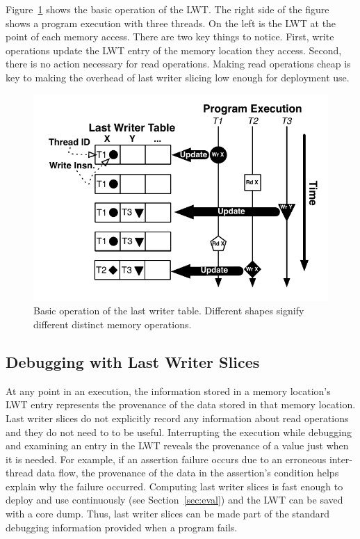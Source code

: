 \documentclass[preprint,9pt]{sigplanconf}
\newcommand{\lwt}{LWT\xspace}
\begin{document}
Figure~\ref{fig:basicLWT} shows the basic operation of the \lwt.  The right
side of the figure shows a program execution with three threads.  On the left
is the \lwt at the point of each memory access.  There are two key things to
notice.  First, write operations update the \lwt entry of the memory location
they access.  Second, there is no action necessary for read operations.
Making read operations cheap is key to making the overhead of last writer
slicing low enough for deployment use.

\begin{figure}[h]
\centering
\includegraphics[scale=.6]{figs/BasicLWT.pdf}
\caption{\label{fig:basicLWT}Basic operation of the last writer table. Different shapes signify different distinct memory operations. }
\end{figure}


\subsection{Debugging with Last Writer Slices}
\label{sec:debugging}

At any point in an execution, the information stored in a memory location's
\lwt entry represents the provenance of the data stored in that memory
location.   Last writer slices do not explicitly record any information about
read operations and they do not need to to be useful.  Interrupting the
execution while debugging and examining an entry in the \lwt reveals the
provenance of a value just when it is needed.  For example, if an assertion
failure occurs due to an erroneous inter-thread data flow, the provenance of
the data in the assertion's condition helps explain why the failure occurred.
Computing last writer slices is fast enough to deploy and use continuously
(see Section~\ref{sec:eval}) and the \lwt can be saved with a core dump.
Thus, last writer slices can be made part of the standard debugging
information provided when a program fails.  
\end{document}
